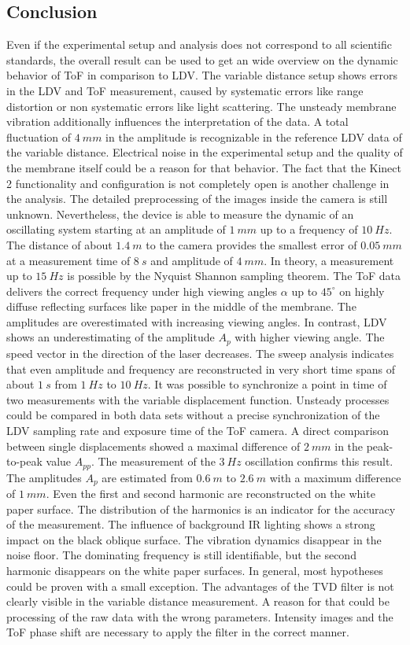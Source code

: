 \newpage
\subsection{Conclusion}
Even if the experimental setup and analysis does not correspond to all scientific standards, the overall result can be used to get an wide overview on the dynamic behavior of ToF in comparison to LDV. The variable distance setup shows errors in the LDV and ToF measurement, caused by systematic errors like range distortion or non systematic errors like light scattering. The unsteady membrane vibration additionally influences the interpretation of the data. A total fluctuation of $4~mm$ in the amplitude is recognizable in the reference LDV data of the variable distance. Electrical noise in the experimental setup and the quality of the membrane itself could be a reason for that behavior. The fact that the Kinect 2 functionality and configuration is not completely open is another challenge in the analysis. The detailed preprocessing of the images inside the camera is still unknown. Nevertheless, the device is able to measure the dynamic of an oscillating system starting at an amplitude of $1~mm$ up to a frequency of $10~Hz$. The distance of about $1.4~m$ to the camera provides the smallest error of $0.05~mm$ at a measurement time of $8~s$ and amplitude of $4~mm$. In theory, a measurement up to $15~Hz$ is possible by the Nyquist Shannon sampling theorem. The ToF data delivers the correct frequency under high viewing angles $\alpha$ up to $45^\circ$ on highly diffuse reflecting surfaces like paper in the middle of the membrane. The amplitudes are overestimated with increasing viewing angles. In contrast, LDV shows an underestimating of the amplitude $A_{p}$ with higher viewing angle. The speed vector in the direction of the laser decreases. The sweep analysis indicates that even amplitude and frequency are reconstructed in very short time spans of about $1~s$ from $1~Hz$ to $10~Hz$. It was possible to synchronize a point in time of two measurements with the variable displacement function. Unsteady processes could be compared in both data sets without a precise synchronization of the LDV sampling rate and exposure time of the ToF camera. A direct comparison between single displacements showed a maximal difference of $2~mm$ in the peak-to-peak value $A_{pp}$. The measurement of the $3~Hz$ oscillation confirms this result. The amplitudes $A_p$ are estimated from $0.6~m$ to $2.6~m$ with a maximum difference of $1~mm$. Even the first and second harmonic are reconstructed on the white paper surface. The distribution of the harmonics is an indicator for the accuracy of the measurement. The influence of background IR lighting shows a strong impact on the black oblique surface. The vibration dynamics disappear in the noise floor. The dominating frequency is still identifiable, but the second harmonic disappears on the white paper surfaces. In general, most hypotheses could be proven with a small exception. The advantages of the TVD filter is not clearly visible in the variable distance measurement. A reason for that could be processing of the raw data with the wrong parameters. Intensity images and the ToF phase shift are necessary to apply the filter in the correct manner.\\  

